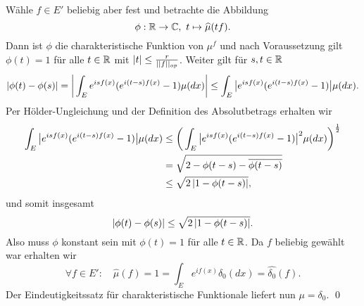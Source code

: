 \begin{proof*}
    Wähle $f \in E'$ beliebig aber fest und betrachte die Abbildung 
    $$
        \phi : \mathbb{R} \to \mathbb{C}, \ t \mapsto \widehat{\mu}(tf). 
    $$
    Dann ist $\phi$ die charakteristische Funktion von $\mu^{f}$ und nach Voraussetzung gilt $\phi(t) = 1$ für alle $t \in \mathbb{R}$ mit $\left| t \right| \leq \frac{r}{\lvert\lvert f \rvert\rvert_{op}}$. 
    Weiter gilt für $s,t \in \mathbb{R}$
    \begin{align*}
        \left| \phi(t) - \phi(s) \right| = \bigg\lvert\int_E e^{isf(x)}(e^{i(t-s)f(x)} - 1)\mu(dx)\bigg\rvert \leq \int_E\big\lvert e^{isf(x)}(e^{i(t-s)f(x)} - 1)\big\rvert\mu(dx).
    \end{align*}
    Per Hölder-Ungleichung und der Definition des Absolutbetrags erhalten wir 
    \begin{align*}
        \int_E\big\lvert e^{isf(x)}(e^{i(t-s)f(x)} - 1)\big\rvert\mu(dx) &\leq \bigg(\int_E\big\lvert e^{isf(x)}(e^{i(t-s)f(x)} - 1)\big\rvert^2\mu(dx)\bigg)^{\frac{1}{2}} \\\
                                                          &= \sqrt{2 - \phi(t-s) - \overline{\phi(t-s)}} \\\
                                                          &\leq \sqrt{2\left| 1-\phi(t-s) \right|},
    \end{align*}
    und somit insgesamt 
    $$
        \left| \phi(t) - \phi(s) \right| \leq \sqrt{2\left| 1-\phi(t-s) \right|}.
    $$
    Also muss $\phi$ konstant sein mit $\phi(t) = 1$ für alle $t \in \mathbb{R}$. Da $f$ beliebig gewählt war erhalten wir
    $$
        \forall f \in E': \quad \widehat{\mu}(f) = 1 = \int_E e^{if(x)}\delta_0(dx) = \widehat{\delta_0}(f). 
    $$
    Der Eindeutigkeitssatz für charakteristische Funktionale liefert nun $\mu = \delta_0$. \qed
\end{proof*}

